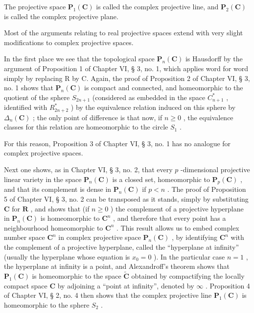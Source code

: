 The projective space \(\mathbf{P}_{1}(\mathbf{C})\) is called the complex projective line, and \(\mathbf{P}_{2}(\mathbf{C})\) is called the complex projective plane.

Most of the arguments relating to real projective spaces extend with very slight modifications to complex projective spaces.

In the first place we see that the topological space \(\mathbf{P}_{n}(\mathbf{C})\) is Hausdorff by the argument of Proposition 1 of Chapter VI, § 3, no. 1, which applies word for word simply by replacing R by C. Again, the proof of Proposition 2 of Chapter VI, § 3, no. 1 shows that \(\mathbf{P}_{n}(\mathbf{C})\) is compact and connected, and homeomorphic to the quotient of the sphere \(S_{2n+1}\) (considered as embedded in the space \(C_{n+1}^{*}\) , identified with \(R_{2n+2}^{*}\) ) by the equivalence relation induced on this sphere by \(\Delta_{n}(\mathbf{C})\) ; the only point of difference is that now, if \(n \geqslant 0\) , the equivalence classes for this relation are homeomorphic to the circle \(S_{1}\) .

For this reason, Proposition 3 of Chapter VI, § 3, no. 1 has no analogue for complex projective spaces.

Next one shows, as in Chapter VI, § 3, no. 2, that every \(p\) -dimensional projective linear variety in the space \(\mathbf{P}_n(\mathbf{C})\) is a closed set, homeomorphic to \(\mathbf{P}_p(\mathbf{C})\) , and that its complement is dense in \(\mathbf{P}_n(\mathbf{C})\) if \(p < n\) . The proof of Proposition 5 of Chapter VI, § 3, no. 2 can be transposed as it stands, simply by substituting \(\mathbf{C}\) for \(\mathbf{R}\) , and shows that (if \(n \geqslant 0\) ) the complement of a projective hyperplane in \(\mathbf{P}_n(\mathbf{C})\) is homeomorphic to \(\mathbf{C}^n\) , and therefore that every point has a neighbourhood homeomorphic to \(\mathbf{C}^n\) . This result allows us to embed complex number space \(\mathbf{C}^n\) in complex projective space \(\mathbf{P}_n(\mathbf{C})\) , by identifying \(\mathbf{C}^n\) with the complement of a projective hyperplane, called the ``hyperplane at infinity'' (usually the hyperplane whose equation is \(x_0 = 0\) ). In the particular case \(n = 1\) , the hyperplane at infinity is a point, and Alexandroff's theorem shows that \(\mathbf{P}_1(\mathbf{C})\) is homeomorphic to the space \(\tilde{\mathbf{C}}\) obtained by compactifying the locally compact space \(\mathbf{C}\) by adjoining a ``point at infinity'', denoted by \(\infty\) . Proposition 4 of Chapter VI, § 2, no. 4 then shows that the complex projective line \(\mathbf{P}_1(\mathbf{C})\) is homeomorphic to the sphere \(S_2\) .

